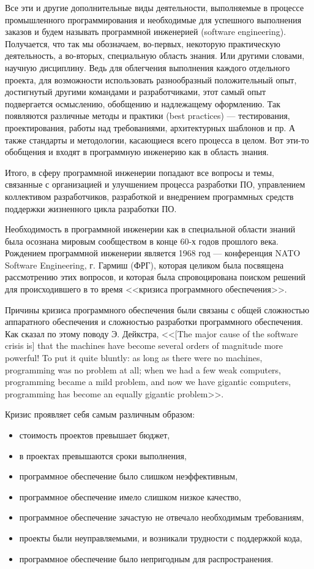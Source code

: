 \documentclass{../../text-style}
\begin{document}
Все эти и другие дополнительные виды деятельности, выполняемые в процессе промышленного программирования и необходимые для успешного выполнения заказов и будем называть программной инженерией (software engineering). Получается, что так мы обозначаем, во-первых, некоторую практическую деятельность, а во-вторых, специальную область знания. Или другими словами, научную дисциплину. Ведь для облегчения выполнения каждого отдельного проекта, для возможности использовать разнообразный положительный опыт, достигнутый другими командами и разработчиками, этот самый опыт подвергается осмыслению, обобщению и надлежащему оформлению. Так появляются различные методы и практики (best practices) --- тестирования, проектирования, работы над требованиями, архитектурных шаблонов и пр. А также стандарты и методологии, касающиеся всего процесса в целом. Вот эти-то обобщения и входят в программную инженерию как в область знания.

Итого, в сферу программной инженерии попадают все вопросы и темы, связанные с организацией и улучшением процесса разработки ПО, управлением коллективом разработчиков, разработкой и внедрением программных средств поддержки жизненного цикла разработки ПО. 

Необходимость в программной инженерии как в специальной области знаний была осознана мировым сообществом в конце 60-х годов прошлого века. Рождением программной инженерии является 1968 год --- конференция NATO Software Engineering, г. Гармиш (ФРГ), которая целиком была посвящена рассмотрению этих вопросов, и которая была спровоцирована поиском решений для происходившего в то время <<кризиса программного обеспечения>>.

Причины кризиса программного обеспечения были связаны с общей сложностью аппаратного обеспечения и сложностью разработки программного обеспечения. Как сказал по этому поводу Э. Дейкстра, <<[The major cause of the software crisis is] that the machines have become several orders of magnitude more powerful! To put it quite bluntly: as long as there were no machines, programming was no problem at all; when we had a few weak computers, programming became a mild problem, and now we have gigantic computers, programming has become an equally gigantic problem>>.

Кризис проявляет себя самым различным образом:
\begin{itemize}
    \item стоимость проектов превышает бюджет,
    \item в проектах превышаются сроки выполнения,
    \item программное обеспечение было слишком неэффективным,
    \item программное обеспечение имело слишком низкое качество,
    \item программное обеспечение зачастую не отвечало необходимым требованиям,
    \item проекты были неуправляемыми, и возникали трудности с поддержкой кода,
    \item программное обеспечение было непригодным для распространения.
\end{itemize}
\end{document}
